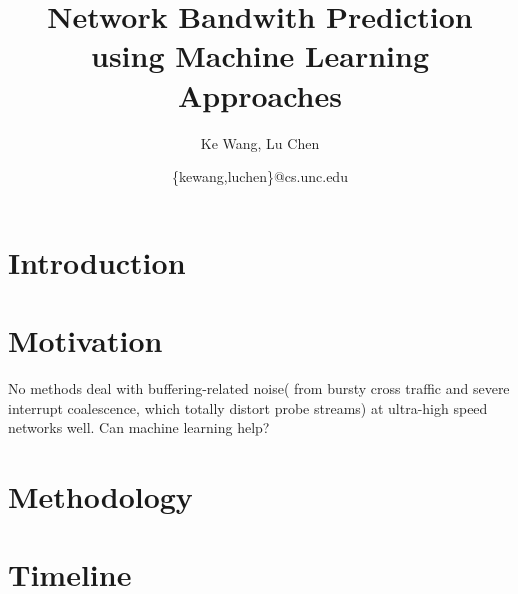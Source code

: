 \documentclass[11pt]{article}
\title{Network Bandwith Prediction using Machine Learning Approaches}
\author{Ke Wang, Lu Chen} %
\date{\{kewang,luchen\}@cs.unc.edu}
\begin{document}
\maketitle

\section{Introduction}
\label{sec:introduction}
\cite{yin2014}
\section{Motivation}
\label{sec:motivation}
No methods deal with buffering-related noise( from bursty cross traffic and
severe interrupt coalescence, which totally distort probe streams) at
ultra-high speed networks well. Can machine learning help?
\section{Methodology}
\label{sec:methodology}

\section{Timeline}
\label{sec:timeline}



\end{document}
